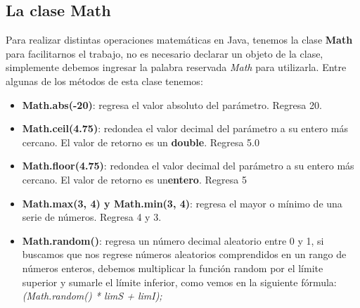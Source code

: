 \subsection{La clase Math}
Para realizar distintas operaciones matemáticas en Java, tenemos la clase \textbf{Math} para facilitarnos el trabajo, no es necesario declarar un objeto de la clase, simplemente debemos ingresar la palabra reservada \textit{Math} para utilizarla. Entre algunas de los métodos de esta clase tenemos:
\begin{itemize}
    \item \textbf{Math.abs(-20)}: regresa el valor absoluto del parámetro. Regresa 20.
    \item \textbf{Math.ceil(4.75)}: redondea el valor decimal del parámetro a su entero más cercano. El valor de retorno es un \textbf{double}. Regresa 5.0
    \item \textbf{Math.floor(4.75)}: redondea el valor decimal del parámetro a su entero más cercano. El valor de retorno es un\textbf{entero}. Regresa 5
    \item \textbf{Math.max(3, 4) y Math.min(3, 4)}: regresa el mayor o mínimo de una serie de números. Regresa 4 y 3.
    \item \textbf{Math.random()}: regresa un número decimal aleatorio entre 0 y 1, si buscamos que nos regrese números aleatorios comprendidos en un rango de números enteros, debemos multiplicar la función random por el límite superior y sumarle el límite inferior, como vemos en la siguiente fórmula: \textit{(Math.random() * limS + limI);}
\end{itemize}

